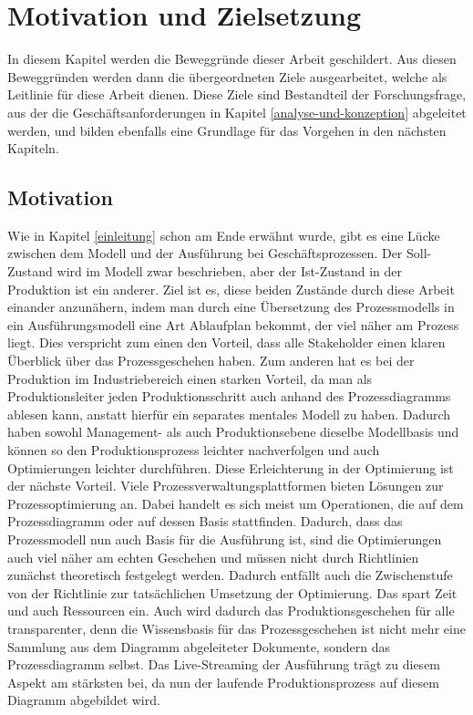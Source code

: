 \chapter{Motivation und Zielsetzung}
\label{motivation-und-zielsetzung}

In diesem Kapitel werden die Beweggründe dieser Arbeit geschildert. Aus diesen Beweggründen 
werden dann die übergeordneten Ziele ausgearbeitet, welche als Leitlinie für diese Arbeit 
dienen. Diese Ziele sind Bestandteil der Forschungsfrage, aus der die 
Geschäftsanforderungen in Kapitel \ref{analyse-und-konzeption} abgeleitet werden, und 
bilden ebenfalls eine Grundlage für das Vorgehen in den nächsten Kapiteln.

\section{Motivation}

Wie in Kapitel \ref{einleitung} schon am Ende erwähnt wurde, gibt es eine Lücke zwischen dem Modell und der 
Ausführung bei Geschäftsprozessen. Der Soll-Zustand wird im Modell zwar beschrieben, aber der Ist-Zustand in der Produktion ist 
ein anderer. Ziel ist es, diese beiden Zustände durch diese Arbeit einander anzunähern, indem man durch eine Übersetzung 
des Prozessmodells in ein Ausführungsmodell eine Art Ablaufplan bekommt, der viel näher am Prozess liegt. Dies verspricht 
zum einen den Vorteil, dass alle Stakeholder einen klaren Überblick über das Prozessgeschehen haben. Zum anderen hat es bei der Produktion im Industriebereich
einen starken Vorteil, da man als Produktionsleiter jeden Produktionsschritt auch anhand des Prozessdiagramms ablesen kann, anstatt hierfür ein
separates mentales Modell zu haben. Dadurch haben sowohl Management- als auch Produktionsebene dieselbe Modellbasis und können so den Produktionsprozess
leichter nachverfolgen und auch Optimierungen leichter durchführen. Diese Erleichterung in der Optimierung ist der nächste Vorteil. Viele Prozessverwaltungsplattformen
bieten Lösungen zur Prozessoptimierung an. Dabei handelt es sich meist um Operationen, die auf dem Prozessdiagramm oder auf dessen Basis stattfinden. Dadurch, dass das Prozessmodell nun auch Basis 
für die Ausführung ist, sind die Optimierungen auch viel näher am echten Geschehen und müssen nicht durch Richtlinien zunächst theoretisch festgelegt werden. Dadurch entfällt 
auch die Zwischenstufe von der Richtlinie zur tatsächlichen Umsetzung der Optimierung. Das spart Zeit und auch Ressourcen ein.
Auch wird dadurch das Produktionsgeschehen für alle transparenter, denn die Wissensbasis für das Prozessgeschehen ist nicht mehr eine Sammlung aus dem Diagramm abgeleiteter Dokumente, 
sondern das Prozessdiagramm selbst. Das Live-Streaming der Ausführung trägt zu diesem Aspekt am stärksten bei, da nun der laufende Produktionsprozess auf diesem Diagramm abgebildet wird.

